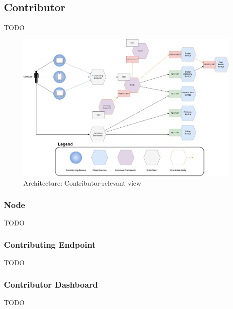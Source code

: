 \subsection{Contributor}
TODO

\begin{figure}[!ht]
    \centering
    \includegraphics[width=\linewidth]{document/chapters/chapter_6/images/architecture_contributor.jpg}
    \caption{Architecture: Contributor-relevant view}
    \label{fig:architecture_contributor}
\end{figure}

\subsubsection{Node}
TODO

\subsubsection{Contributing Endpoint}
TODO

\subsubsection{Contributor Dashboard}
TODO

